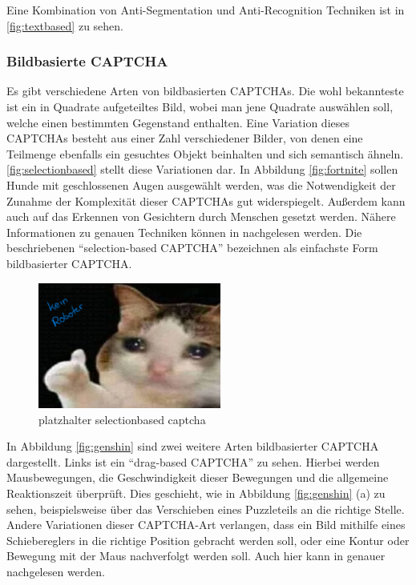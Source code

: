 Eine Kombination von Anti-Segmentation und Anti-Recognition Techniken ist in \autoref{fig:textbased} zu sehen.

\subsubsection*{Bildbasierte CAPTCHA}
Es gibt verschiedene Arten von bildbasierten CAPTCHAs. 
Die wohl bekannteste ist ein in Quadrate aufgeteiltes Bild, wobei man jene Quadrate auswählen soll, welche einen bestimmten Gegenstand enthalten.
Eine Variation dieses CAPTCHAs besteht aus einer Zahl verschiedener Bilder, von denen eine Teilmenge ebenfalls ein gesuchtes Objekt beinhalten 
und sich semantisch ähneln. 
\autoref{fig:selectionbased} stellt diese Variationen dar.
In Abbildung \ref{fig:fortnite} sollen Hunde mit geschlossenen Augen ausgewählt werden,
was die Notwendigkeit der Zunahme der Komplexität dieser CAPTCHAs gut widerspiegelt. 
Außerdem kann auch auf das Erkennen von Gesichtern durch Menschen gesetzt werden.
Nähere Informationen zu genauen Techniken können in \cite[p.xx]{surveyofresearch} nachgelesen werden.
Die beschriebenen ``selection-based CAPTCHA'' bezeichnen \citeauthor{surveyofresearch} als einfachste Form bildbasierter CAPTCHA. \cite[p.77]{surveyofresearch}

\begin{figure}[h!]
    \centering\includegraphics[width=6cm]{gfx/mygraphics/platzhalter.png}
     \caption{platzhalter selectionbased captcha}
      \label{fig:selectionbased}
\end{figure}

In Abbildung \ref{fig:genshin} sind zwei weitere Arten bildbasierter CAPTCHA dargestellt.
Links ist ein ``drag-based CAPTCHA'' zu sehen.
Hierbei werden Mausbewegungen, die Geschwindigkeit dieser Bewegungen
und die allgemeine Reaktionszeit überprüft.
Dies geschieht, wie in Abbildung \ref{fig:genshin} (a) zu sehen,
beispielsweise über das Verschieben eines Puzzleteils an die richtige Stelle.
Andere Variationen dieser CAPTCHA-Art verlangen, dass ein Bild mithilfe eines Schiebereglers in die richtige Position gebracht werden soll,
oder eine Kontur oder Bewegung mit der Maus nachverfolgt werden soll.
Auch hier kann in \cite[p.77]{surveyofresearch} genauer nachgelesen werden.

